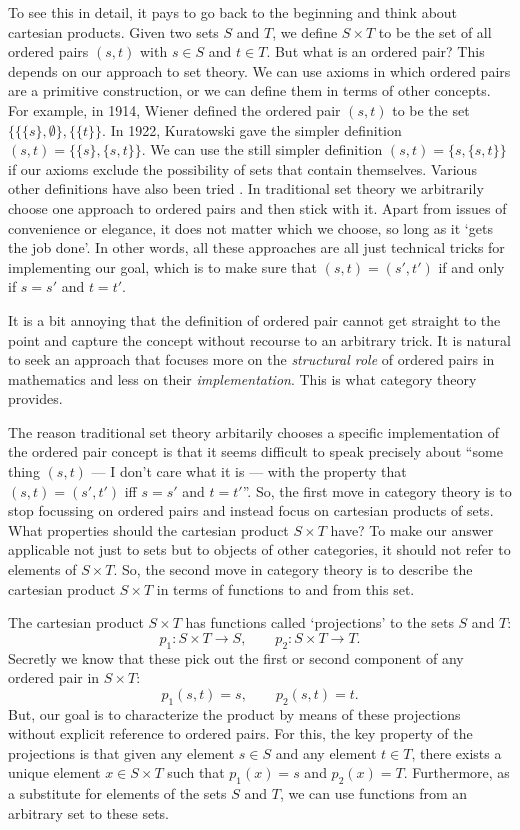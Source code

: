 \documentclass{article}
\renewcommand{\to}{\rightarrow}
\newcommand{\maps}{\colon}
\begin{document}
To see this in detail, it pays to go back to the beginning and think
about cartesian products.  Given two sets $S$ and $T$, we define $S
\times T$ to be the set of all ordered pairs $(s,t)$ with $s \in S$
and $t \in T$.  But what is an ordered pair?  This depends on our
approach to set theory.  We can use axioms in which ordered pairs are
a primitive construction, or we can define them in terms of other
concepts.  For example, in 1914, Wiener defined the ordered pair
$(s,t)$ to be the set $\{ \{ \{s\}, \emptyset \}, \{ \{t\} \}$.  In
1922, Kuratowski gave the simpler definition $(s,t) =
\{ \{s\}, \{s,t\} \}$.  We can use the still simpler definition 
$(s,t) = \{s,\{s,t\}\}$ if our axioms exclude the possibility of sets
that contain themselves.  Various other definitions have also been
tried \cite{Kanamori}.  In traditional set theory we arbitrarily
choose one approach to ordered pairs and then stick with it.  Apart
from issues of convenience or elegance, it does not matter which we
choose, so long as it `gets the job done'.  In other words, all these
approaches are all just technical tricks for implementing our goal, which
is to make sure that $(s,t) = (s',t')$ if and only if $s = s'$ and $t = t'$.

It is a bit annoying that the definition of ordered pair cannot get
straight to the point and capture the concept without recourse to an
arbitrary trick.  It is natural to seek an approach that focuses more
on the {\it structural role} of ordered pairs in mathematics and less
on their {\it implementation}.  This is what category theory provides.

The reason traditional set theory arbitarily chooses a specific
implementation of the ordered pair concept is that it seems difficult
to speak precisely about ``some thing $(s,t)$ --- I don't care what it
is --- with the property that $(s,t) = (s',t')$ iff $s = s'$ and $t =
t'$''.  So, the first move in category theory is to stop focussing on
ordered pairs and instead focus on cartesian products of sets.  What
properties should the cartesian product $S \times T$ have?  To make
our answer applicable not just to sets but to objects of other
categories, it should not refer to elements of $S \times T$.  So, the
second move in category theory is to describe the cartesian product $S
\times T$ in terms of functions to and from this set.

The cartesian product $S \times T$ has 
functions called `projections' to the sets $S$ and $T$:
\[           p_1 \maps S \times T \to S , \qquad
           p_2 \maps S \times T \to T .\]
Secretly we know that these pick out the first or second 
component of any ordered pair in $S \times T$:
\[          p_1(s,t) = s, \qquad p_2(s,t) = t  .\]
But, our goal is to characterize the product by means of these
projections without explicit reference to ordered pairs.  For this,
the key property of the projections is that given any element $s \in
S$ and any element $t \in T$, there exists a unique element $x \in S
\times T$ such that $p_1(x) = s$ and $p_2(x) = T$.  Furthermore, as a
substitute for elements of the sets $S$ and $T$, we can use functions
from an arbitrary set to these sets.
\end{document}
